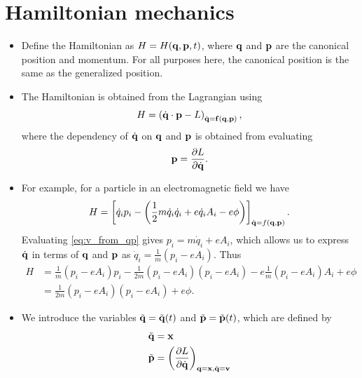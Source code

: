 \documentclass[a4paper,11pt]{report}
\newcommand{\qvecdot}{\dot{\qvec}}
\newcommand{\qdot}{\dot{q}}
\begin{document}
\section{Hamiltonian mechanics}
\begin{itemize}
    \item Define the Hamiltonian as $H = H(\mathbf{q}, \mathbf{p}, t)$, where $\mathbf{q}$ and $\mathbf{p}$ are the canonical position and momentum. For all purposes here, the canonical position is the same as the generalized position.
    
    \item The Hamiltonian is obtained from the Lagrangian using
    \begin{equation}
    H = \left ( \qvecdot \cdot \pvec - L \right)_{\qvecdot = \fvec(\qvec, \pvec)},
    \end{equation} 
    where the dependency of $\qvecdot$ on $\mathbf{q}$ and $\mathbf{p}$ is obtained from evaluating
    \begin{equation}
    \label{eq:v_from_qp}
    \pvec = \frac{ \partial L}{\partial \qvecdot}.
    \end{equation}
    
    \item For example, for a particle in an electromagnetic field we have
    \begin{equation}
    H = \left [ \qdot_i p_i - \left ( \frac{1}{2} m \qdot_i \qdot_i + e \qdot_i A_i - e\phi \right ) \right]_{\qvecdot = f(\qvec, \pvec)}. 
    \end{equation}
    Evaluating \cref{eq:v_from_qp} gives $ p_i = m \qdot_i + e A_i $, which allows us to express $\qvecdot$ in terms of $\mathbf{q}$ and $\mathbf{p}$ as $\qdot_i = \frac{1}{m} (p_i - eA_i )$. Thus
    \begin{align}
    H &= \frac{1}{m} (p_i - eA_i)p_i - \frac{1}{2m} (p_i - eA_i) (p_i-eA_i) - e\frac{1}{m} (p_i -eA_i) A_i + e\phi \nonumber \\
    & = \frac{1}{2m} (p_i -eA_i) (p_i -eA_i) + e\phi.
    \end{align}
    
    \item We introduce the variables $\tilde{\mathbf{q}} = \tilde{\mathbf{q}}(t)$ and $\tilde{\mathbf{p}} = \tilde{\mathbf{p}}(t)$, which are defined by
    \begin{align}
    \tilde{\qvec} &= \xvec \\ 
    \tilde{\pvec} & = \left ( \frac{\partial L}{\partial \qvecdot} \right)_{\qvec = \xvec, \qvecdot = \vvec}
    \end{align}
    

\end{itemize}
\end{document}

